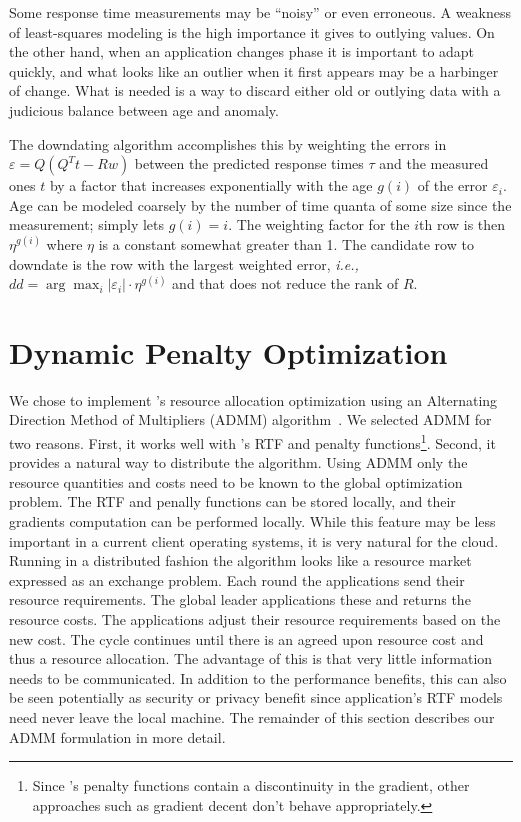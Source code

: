 Some response time measurements may be ``noisy'' or even erroneous.
A weakness of least-squares modeling is the high importance it gives to outlying values.
On the other hand, when an application changes phase it is important to adapt quickly,
and what looks like an outlier when it first appears may be a harbinger of change.
What is needed is a way to discard either old or outlying data
with a judicious balance between age and anomaly.

The downdating algorithm accomplishes this by weighting the errors in $\varepsilon = Q(Q^Tt - Rw)$
between the predicted response times $\tau$ and the measured ones $t$ by a factor
that increases exponentially with the age $g(i)$ of the error $\varepsilon_i$.
Age can be modeled coarsely by the number of time quanta of some size since the measurement;
\pacora simply lets $g(i) = i$.
The weighting factor for the $i$th row is then $\eta^{g(i)}$ where $\eta$ is a constant somewhat greater than 1.
The candidate row to downdate is the row with the largest weighted error, \emph{i.e.,}
$dd = \arg\max_i |\varepsilon_i| \cdot \eta^{g(i)}$ and that does not reduce the rank of $R$.



\section{Dynamic Penalty Optimization}\label{dyn_opt}

We chose to implement \pacora's resource allocation optimization using an Alternating Direction Method of Multipliers (ADMM) algorithm~\cite{ADMM}.  We selected ADMM for two reasons. First, it works well with \pacora's RTF and penalty functions\footnote{Since \pacora's penalty functions contain a discontinuity in the gradient, other approaches such as gradient decent don't behave appropriately.}.  Second, it provides a natural way to distribute the algorithm.  Using ADMM only the resource quantities and costs need to be known to the global optimization problem.  The RTF and penally functions can be stored locally, and their gradients computation can be performed locally.  While this feature may be less important in a current client operating systems, it is very natural for the cloud.  Running in a distributed fashion the algorithm looks like a resource market expressed as an exchange problem.  Each round the applications send their resource requirements.  The global leader applications these and returns the resource costs.  The applications adjust their resource requirements based on the new cost.  The cycle continues until there is an agreed upon resource cost and thus a resource allocation.   The advantage of this is that very little information needs to be communicated.  In addition to the performance benefits, this can also be seen potentially as security or privacy benefit since application's RTF models need never leave the local machine.  The remainder of this section describes our ADMM formulation in more detail.

